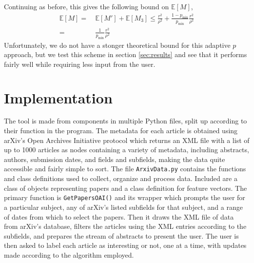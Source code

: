 \documentclass[12pt]{article}
\newcommand{\E}[0]{\mathbb{E}}
\begin{document}
Continuing as before, this gives the following bound on $\E[M]$,
\begin{align*}
\E[M] = &\ \E[M'] + \E[M_3] \leq \frac{r^2}{\rho^2} + \frac{1-p_{\min}}{p_{\min}} \frac{r^2}{\rho^2}\\
= &\ \frac{1}{p_{\min}}\frac{r^2}{\rho^2}
\end{align*}
Unfortunately, we do not have a stonger theoretical bound for this adaptive $p$ approach, but we test this scheme in section \ref{sec:results} and see that it performs fairly well while requiring less input from the user.

\section{Implementation}
The tool is made from components in multiple Python files, split up according to their function in the program.
The metadata for each article is obtained using arXiv's Open Archives Initiative protocol which returns an XML file with a list of up to 1000 articles as nodes containing a variety of metadata, including abstracts, authors, submission dates, and fields and subfields, making the data quite accessible and fairly simple to sort.
The file {\tt ArxivData.py} contains the functions and class definitions used to collect, organize and process data. Included are a class of objects representing papers and a class definition for feature vectors.
%
%
The primary function is {\tt GetPapersOAI()} and its wrapper which prompts the user for a particular subject, any of arXiv's listed subfields for that subject, and a range of dates from which to select the papers.
Then it draws the XML file of data from arXiv's database, filters the articles using the XML entries according to the subfields, and prepares the stream of abstracts to present the user.
The user is then asked to label each article as interesting or not, one at a time, with updates made according to the algorithm employed.



\end{document}
